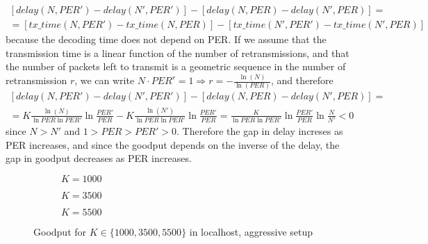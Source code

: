 \begin{equation}
\begin{split}
[delay(N,PER')-delay(N',PER')]-[delay(N,PER)-delay(N',PER)]=\\
=[tx\_time(N,PER')-tx\_time(N,PER)]-[tx\_time(N',PER')-tx\_time(N',PER)]
\end{split}
\end{equation}
because the decoding time does not depend on PER. If we assume that the transmission time is a linear function of the number of retransmissions, and that the number of packets left to transmit is a geometric sequence in the number of retransmission $r$, we can write $N\cdot PER^r=1 \Rightarrow r=-\frac{\ln(N)}{\ln(PER)}$, and therefore
\begin{equation}
\begin{split}
[delay(N,PER')-delay(N',PER')]-[delay(N,PER)-delay(N',PER)]=\\ 
=K\frac{\ln(N)}{\ln PER \ln PER'}\ln{\frac{PER'}{PER}}-K\frac{\ln(N')}{\ln PER \ln PER'}\ln{\frac{PER'}{PER}}=\frac{K}{\ln PER \ln PER'}\ln{\frac{PER'}{PER}}\ln{\frac{N}{N'}}<0
\end{split}
\end{equation}
since $N>N'$ and $1>PER>PER'>0$. Therefore the gap in delay increses as PER increases, and since the goodput depends on the inverse of the delay, the gap in goodput decreases as PER increases.
\begin{figure}[!hp]
\centering
\begin{subfigure}{0.24\textwidth}
	\captionsetup{justification=centering,font=scriptsize}
	\centering
	\setlength\fwidth{\textwidth}
	\setlength{}
	
	\caption{$K=1000$}
	\label{fig:lh_good_1000}
\end{subfigure}\hspace{2em}%
\begin{subfigure}{0.23\textwidth}
	\captionsetup{justification=centering,font=scriptsize}
	\centering
	\setlength\fwidth{\textwidth}
	\setlength{}
	
	\caption{$K=3500$}
	\label{fig:lh_good_3500}
\end{subfigure}\hspace{2em}%
\begin{subfigure}{0.23\textwidth}
	\captionsetup{justification=centering,font=scriptsize}
	\centering
	\setlength\fwidth{\textwidth}
	\setlength{}
	
	\caption{$K=5500$}
	\label{fig:lh_good_5500}
\end{subfigure}
\caption{Goodput for $K \in \{1000, 3500, 5500\}$ in localhost, aggressive setup}
\label{fig:goodput_aggr}
\end{figure}

